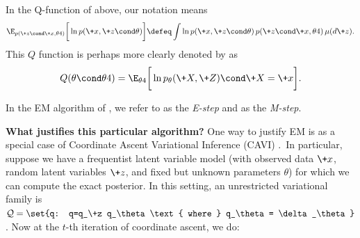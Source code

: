 \documentclass{article} %
\newcommand{\param}{\theta}
\begin{document}
\begin{notation}
In the Q-function of 
above, our notation means
%
\[\E_{p(\+z \cond \+x , \param^^t)} \bigg[ \ln p(\+x, \+z \cond \param) \bigg] \defeq \int \ln p(\+x, \+z \cond \param) \, p(\+z \cond \+x , \param^^t) \, \mu(d\+z).\]
%
This $Q$ function is perhaps more clearly denoted by \citet{miller2011why} as 
%
\[  Q(\param \cond \param^^t)  = \E_{\param^^t} \bigg[ \ln p_{\param}(\+X, \+Z) \cond \+X=\+x \bigg].\]
%
\label{notation:Q_function}
\end{notation}


In the EM algorithm of 
, we refer to  as the \textit{E-step} and  as the \textit{M-step}.

\textbf{What justifies this particular algorithm?}  One way to justify EM is as a special case of Coordinate Ascent Variational Inference (CAVI) \cite{wojnowiczXXXXvariational}.\footnotemark~In particular, suppose we have a frequentist latent variable model (with observed data $\+x$, random latent variables $\+z$, and fixed but unknown parameters $\param$) for which we can compute the exact posterior.  In this setting, an unrestricted variational family is $\mathcal{Q} = \set{q: q=q_\+z q_\param \text{ where } q_\param = \delta_\param}$.  Now at the $t$-th iteration of coordinate ascent, we do:

\end{document}
